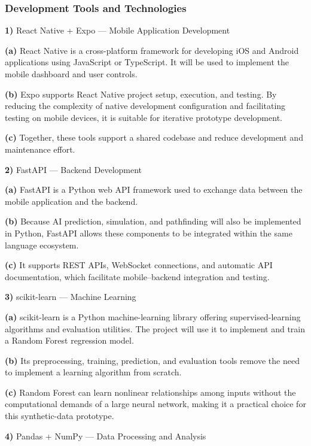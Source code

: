 \documentclass[conference]{IEEEtran}
\begin{document}
\subsubsection{Development Tools and Technologies}
\par\noindent\textbf{1)} React Native + Expo --- Mobile Application Development
\par\noindent\textbf{(a)} React Native is a cross-platform framework for developing iOS and Android applications using JavaScript or TypeScript. It will be used to implement the mobile dashboard and user controls.
\par\noindent\textbf{(b)} Expo supports React Native project setup, execution, and testing. By reducing the complexity of native development configuration and facilitating testing on mobile devices, it is suitable for iterative prototype development.
\par\noindent\textbf{(c)} Together, these tools support a shared codebase and reduce development and maintenance effort.
\par\noindent\textbf{2)} FastAPI --- Backend Development
\par\noindent\textbf{(a)} FastAPI is a Python web API framework used to exchange data between the mobile application and the backend.
\par\noindent\textbf{(b)} Because AI prediction, simulation, and pathfinding will also be implemented in Python, FastAPI allows these components to be integrated within the same language ecosystem.
\par\noindent\textbf{(c)} It supports REST APIs, WebSocket connections, and automatic API documentation, which facilitate mobile--backend integration and testing.
\par\noindent\textbf{3)} scikit-learn --- Machine Learning
\par\noindent\textbf{(a)} scikit-learn is a Python machine-learning library offering supervised-learning algorithms and evaluation utilities. The project will use it to implement and train a Random Forest regression model.
\par\noindent\textbf{(b)} Its preprocessing, training, prediction, and evaluation tools remove the need to implement a learning algorithm from scratch.
\par\noindent\textbf{(c)} Random Forest can learn nonlinear relationships among inputs without the computational demands of a large neural network, making it a practical choice for this synthetic-data prototype.
\par\noindent\textbf{4)} Pandas + NumPy --- Data Processing and Analysis
\end{document}
